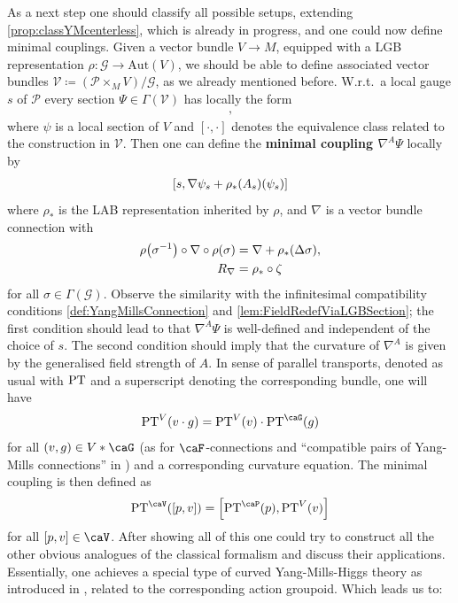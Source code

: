 \documentclass[reqno,a4paper,oneside]{amsart}
\theoremstyle{plain}
\theoremstyle{remark}
\theoremstyle{definition}
\begin{document}
As a next step one should classify all possible setups, extending \ref{prop:classYMcenterless}, which is already in progress, and one could now define minimal couplings. Given a vector bundle $V \to M$, equipped with a LGB representation $\rho \colon \mathcal{G} \to \mathrm{Aut}(V)$, we should be able to define associated vector bundles $\mathcal{V} \coloneqq ( \mathcal{P} \times_M V ) \Big/ \mathcal{G}$, as we already mentioned before. W.r.t.\ a local gauge $s$ of $\mathcal{P}$ every section $\Psi \in \Gamma(\mathcal{V})$ has locally the form
\begin{align*}
[s, \psi_s],
\end{align*}
where $\psi$ is a local section of $V$ and $[ \cdot, \cdot ]$ denotes the equivalence class related to the construction in $\mathcal{V}$. Then one can define the \textbf{minimal coupling $\nabla^A \Psi$} locally by
\begin{align*}
\mleft[  s,
	\nabla \psi_s + \rho_*(A_s)(\psi_s)
\mright]
\end{align*} 
where $\rho_*$ is the LAB representation inherited by $\rho$, and $\nabla$ is a vector bundle connection with
\begin{align*}
\rho\mleft( \sigma^{-1} \mright) \circ \nabla \circ \rho(\sigma)
&=
\nabla
    + \rho_*(\Delta \sigma),
\\
R_\nabla
&=
\rho_* \circ \zeta
\end{align*}
for all $\sigma \in \Gamma(\mathcal{G})$.
Observe the similarity with the infinitesimal compatibility conditions \ref{def:YangMillsConnection} and \ref{lem:FieldRedefViaLGBSection}; the first condition should lead to that $\nabla^A \Psi$ is well-defined and independent of the choice of $s$. The second condition should imply that the curvature of $\nabla^A$ is given by the generalised field strength of $A$. In sense of parallel transports, denoted as usual with $\rm PT$ and a superscript denoting the corresponding bundle, one will have
\begin{equation*}
{\rm PT}^V(v\cdot g)
=
{\rm PT}^V(v) \cdot
{\rm PT}^\caG(g)
\end{equation*}
for all $(v, g) \in V*\caG$ (as for $\caF$-connections and ``compatible pairs of Yang-Mills connections'' in \cite{Fischer:2401.05966}) and a corresponding curvature equation. The minimal coupling is then defined as
\begin{equation*}
{\rm PT}^\caV([p, v])
=
\mleft[ {\rm PT}^\caP(p), {\rm PT}^V(v) \mright]
\end{equation*}
for all $[p, v] \in \caV$. After showing all of this one could try to construct all the other obvious analogues of the classical formalism and discuss their applications. Essentially, one achieves a special type of curved Yang-Mills-Higgs theory as introduced in \cite{Fischer:2024vak}, related to the corresponding action groupoid. Which leads us to:
\end{document}
